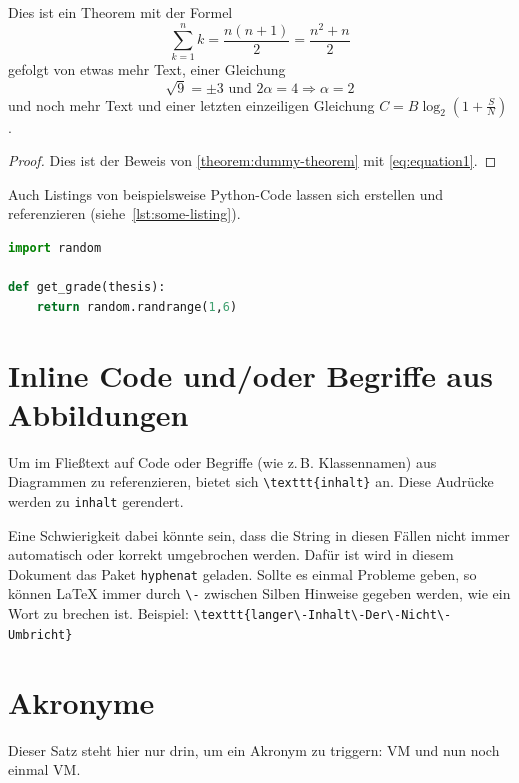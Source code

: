 
\begin{theorem}\label{theorem:dummy-theorem}
Dies ist ein Theorem mit der Formel
\begin{equation}
\label{eq:equation1}
\sum_{k=1}^n k=\frac{n(n+1)}{2}=\frac{n^2+n}{2}
\end{equation}
gefolgt von etwas mehr Text, einer Gleichung
$$\sqrt{9}=\pm3\text{ und }2\alpha=4\Rightarrow\alpha=2$$
und noch mehr Text und einer letzten einzeiligen Gleichung \(C = B \log_2 \left(1 + \frac{S}{N} \right) \).
\end{theorem}

\begin{proof}
Dies ist der Beweis von \cref{theorem:dummy-theorem} mit \cref{eq:equation1}.
\end{proof}


Auch Listings von beispielsweise Python-Code lassen sich erstellen und referenzieren
(siehe~\cref{lst:some-listing}).
\begin{lstlisting}[language=Python, caption=Python Listing, label=lst:some-listing]
import random
    
def get_grade(thesis):
    return random.randrange(1,6)
\end{lstlisting}


\section{Inline Code und/oder Begriffe aus Abbildungen}\label{sect-inline-code}

Um im Fließtext auf Code oder Begriffe (wie z.\,B. Klassennamen) aus Diagrammen zu referenzieren, bietet sich
\texttt{\textbackslash\-texttt\{inhalt\}}
an.
Diese Audrücke werden zu \texttt{inhalt} gerendert.

Eine Schwierigkeit dabei könnte sein, dass die String in diesen Fällen nicht immer automatisch oder korrekt umgebrochen werden.
Dafür ist wird in diesem Dokument das Paket \texttt{hyphenat} geladen.
Sollte es einmal Probleme geben, so können LaTeX immer durch \texttt{\textbackslash-} zwischen Silben Hinweise gegeben werden, wie ein Wort zu brechen ist.
Beispiel: \texttt{\textbackslash\-texttt\{langer\textbackslash-Inhalt\textbackslash-Der\textbackslash-Nicht\textbackslash-Umbricht\}}

\section{Akronyme}\label{acronyms}

Dieser Satz steht hier nur drin, um ein Akronym zu triggern: \ac{VM} und nun noch einmal \ac{VM}.
